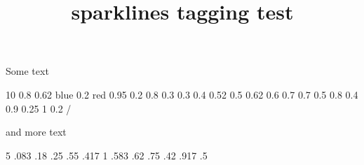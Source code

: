 \documentclass{article}
\title{sparklines tagging test}
\begin{document}
Some text
\begin{sparkline}{10}
 0.8
 0.62 blue
 0.2 red
 0.95 0.2 0.8 0.3 0.3 0.4 0.52 0.5 0.62
       0.6 0.7 0.7 0.5 0.8 0.4 0.9 0.25 1 0.2 /
\end{sparkline}
and more text

\begin{sparkline}{5}
\sparkspike .083 .18
\sparkspike .25 .55
\sparkspike .417 1
\sparkspike .583 .62
\sparkspike .75 .42
\sparkspike .917 .5
\end{sparkline}
\end{document}
